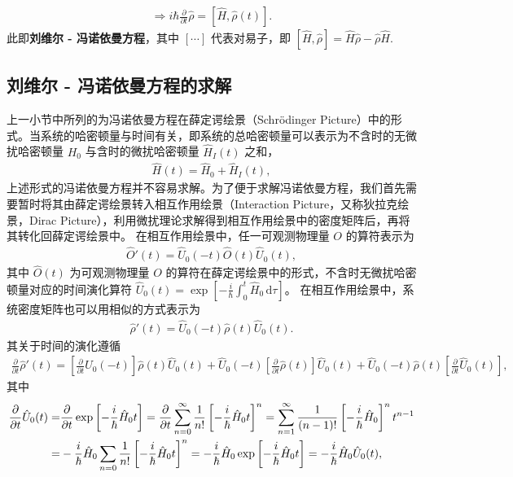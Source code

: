 \documentclass{thesis}
\begin{document}
\begin{gather}
    \label{von Neumann Equ}
    \Longrightarrow i\hbar\frac{\partial}{\partial t}\hat{\rho}=[\hat{H},\hat{\rho}(t)].
\end{gather}
此即\textbf{刘维尔 - 冯诺依曼方程}，其中 $[\cdots]$ 代表对易子，即 $[\hat{H},\hat{\rho}]=\hat{H}\hat{\rho}-\hat{\rho}\hat{H}$.

\subsection{刘维尔 - 冯诺依曼方程的求解}
上一小节中所列的为冯诺依曼方程在薛定谔绘景（Schrödinger Picture）中的形式。当系统的哈密顿量与时间有关，即系统的总哈密顿量可以表示为不含时的无微扰哈密顿量 $H_0$ 与含时的微扰哈密顿量 $\hat{H}_I(t)$ 之和，
\begin{align}
    \hat{H}(t)=\hat{H}_0+\hat{H}_I(t),
\end{align}
上述形式的冯诺依曼方程并不容易求解。为了便于求解冯诺依曼方程，我们首先需要暂时将其由薛定谔绘景转入相互作用绘景（Interaction Picture，又称狄拉克绘景，Dirac Picture），利用微扰理论求解得到相互作用绘景中的密度矩阵后，再将其转化回薛定谔绘景中。
在相互作用绘景中，任一可观测物理量 $O$ 的算符表示为
\begin{align}
    \hat{O}'(t)=\hat{U}_0(-t)\hat{O}(t)\hat{U}_0(t),
\end{align}
其中 $\hat{O}(t)$ 为可观测物理量 $O$ 的算符在薛定谔绘景中的形式，不含时无微扰哈密顿量对应的时间演化算符 $\hat{U}_0(t)=\exp\left[-\frac{i}{\hbar}\int_0^t\hat{H}_0\,\mathrm{d}\tau\right]$。
在相互作用绘景中，系统密度矩阵也可以用相似的方式表示为
\begin{align}
    \hat{\rho}'(t)=\hat{U}_0(-t)\hat{\rho}(t)\hat{U}_0(t).
\end{align}
其关于时间的演化遵循
\begin{align}
    \frac{\partial}{\partial t}\hat{\rho}'(t)=\left[\frac{\partial}{\partial t}\hat{U}_0(-t)\right]\hat{\rho}(t)\hat{U}_0(t)+\hat{U}_0(-t)\left[\frac{\partial}{\partial t}\hat{\rho}(t)\right]\hat{U}_0(t)+\hat{U}_0(-t)\hat{\rho}(t)\left[\frac{\partial}{\partial t}\hat{U}_0(t)\right],
\end{align}
其中
\begin{align}
    \notag\frac{\partial}{\partial t}\hat{U}_0(t)=&\frac{\partial}{\partial t}\exp\left[-\frac{i}{\hbar}\hat{H}_0t\right]=\frac{\partial}{\partial t}\sum_{n=0}^{\infty}\frac{1}{n!}\left[-\frac{i}{\hbar}\hat{H}_0t\right]^n=\sum_{n=1}^{\infty}\frac{1}{(n-1)!}\left[-\frac{i}{\hbar}\hat{H}_0\right]^nt^{n-1}\\
    =&-\frac{i}{\hbar}\hat{H}_0\sum_{n=0}\frac{1}{n!}\left[-\frac{i}{\hbar}\hat{H}_0t\right]^n=-\frac{i}{\hbar}\hat{H}_0\exp\left[-\frac{i}{\hbar}\hat{H}_0t\right]=-\frac{i}{\hbar}\hat{H}_0\hat{U}_0(t),
\end{align}
\end{document}
